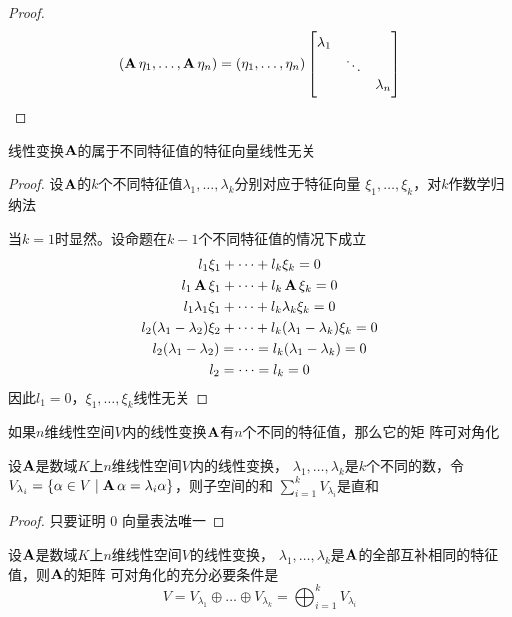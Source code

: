 \documentclass[11pt]{article}
\begin{document}
\begin{proof}
\begin{equation*}
(\operatorname{\textbf{A}}\eta_1,\dots,\operatorname{\textbf{A}}\eta_n)=(\eta_1,\dots,\eta_n)
\begin{bmatrix}
\lambda_1&&\\
&\ddots&\\
&&\lambda_n
\end{bmatrix}
\end{equation*}
\end{proof}

\begin{proposition}[]
线性变换\(\operatorname{\textbf{A}}\)的属于不同特征值的特征向量线性无关
\end{proposition}

\begin{proof}
设\(\operatorname{\textbf{A}}\)的\(k\)个不同特征值\(\lambda_1,\dots,\lambda_k\)分别对应于特征向量
\(\xi_1,\dots,\xi_k\)，对\(k\)作数学归纳法

当\(k=1\)时显然。设命题在\(k-1\)个不同特征值的情况下成立
\begin{gather*}
l_1\xi_1+\dots+l_k\xi_k=0\\
l_1\operatorname{\textbf{A}}\xi_1+\dots+l_k\operatorname{\textbf{A}}\xi_k=0\\
l_1\lambda_1\xi_1+\dots+l_k\lambda_k\xi_k=0\\
l_2(\lambda_1-\lambda_2)\xi_2+\dots+l_k(\lambda_1-\lambda_k)\xi_k=0\\
l_2(\lambda_1-\lambda_2)=\cdots=l_k(\lambda_1-\lambda_k)=0\\
l_2=\dots=l_k=0
\end{gather*}
因此\(l_1=0\)，\(\xi_1,\dots,\xi_k\)线性无关
\end{proof}

\begin{corollary}[]
如果\(n\)维线性空间\(V\)内的线性变换\(\operatorname{\textbf{A}}\)有\(n\)个不同的特征值，那么它的矩
阵可对角化
\end{corollary}

\begin{proposition}[]
设\(\operatorname{\textbf{A}}\)是数域\(K\)上\(n\)维线性空间\(V\)内的线性变换，
\(\lambda_1,\dots,\lambda_k\)是\(k\)个不同的数，令\(V_{\lambda_i}=\{\alpha\in
   V\mid \operatorname{\textbf{A}}\alpha=\lambda_i\alpha\}\)，则子空间的和
\(\sum_{i=1}^kV_{\lambda_i}\)是直和
\end{proposition}

\begin{proof}
只要证明 0 向量表法唯一
\end{proof}

\begin{theorem}[]
设\(\operatorname{\textbf{A}}\)是数域\(K\)上\(n\)维线性空间\(V\)的线性变换，
\(\lambda_1,\dots,\lambda_k\)是\(\operatorname{\textbf{A}}\)的全部互补相同的特征值，则\(\operatorname{\textbf{A}}\)的矩阵
可对角化的充分必要条件是
\begin{equation*}
V=V_{\lambda_1}\oplus\dots\oplus V_{\lambda_k}=
\bigoplus_{i=1}^kV_{\lambda_i}
\end{equation*}
\end{theorem}
\end{document}
